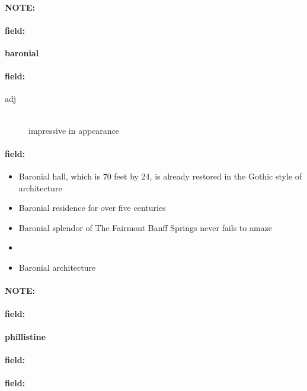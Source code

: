 \documentclass[12pt]{article}
\newenvironment{note}{\paragraph{NOTE:}}{}
\newenvironment{field}{\paragraph{field:}}{}
\begin{document}
\begin{note}
\begin{field}
\textbf{\large baronial}
\end{field}


\begin{field}
\begin{description}
\item[adj] \hfill \\ 
impressive in appearance

\end{description}
\end{field}

\begin{field}
\begin{itemize}
\item Baronial hall, which is 70 feet by 24, is already restored in the Gothic style of architecture
\item Baronial residence for over five centuries
\item Baronial splendor of The Fairmont Banff Springs never fails to amaze
\item 
\item Baronial architecture
\end{itemize}
\end{field}
\end{note}
\begin{note}
\begin{field}
\textbf{\large phillistine}
\end{field}


\begin{field}
\end{field}

\begin{field}
\end{field}
\end{note}
\end{document}
